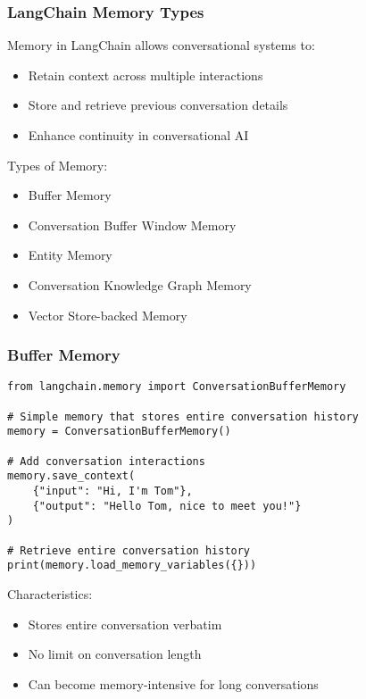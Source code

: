 \begin{frame}[fragile]\frametitle{LangChain Memory Types}

Memory in LangChain allows conversational systems to:
\begin{itemize}
\item Retain context across multiple interactions
\item Store and retrieve previous conversation details
\item Enhance continuity in conversational AI
\end{itemize}

Types of Memory:
\begin{itemize}
\item Buffer Memory
\item Conversation Buffer Window Memory
\item Entity Memory
\item Conversation Knowledge Graph Memory
\item Vector Store-backed Memory
\end{itemize}

\end{frame}

\begin{frame}[fragile]\frametitle{Buffer Memory}

\begin{lstlisting}
from langchain.memory import ConversationBufferMemory

# Simple memory that stores entire conversation history
memory = ConversationBufferMemory()

# Add conversation interactions
memory.save_context(
    {"input": "Hi, I'm Tom"},
    {"output": "Hello Tom, nice to meet you!"}
)

# Retrieve entire conversation history
print(memory.load_memory_variables({}))
\end{lstlisting}

Characteristics:
\begin{itemize}
\item Stores entire conversation verbatim
\item No limit on conversation length
\item Can become memory-intensive for long conversations
\end{itemize}

\end{frame}

